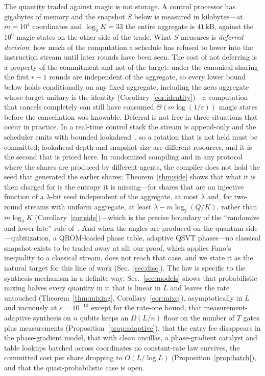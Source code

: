 \documentclass[aps,prx,twocolumn,superscriptaddress,nofootinbib,longbibliography]{revtex4-2}
\theoremstyle{plain}
\theoremstyle{definition}
\theoremstyle{remark}
\begin{document}
The quantity traded against magic is not storage. A control processor has gigabytes of memory and the snapshot $S$ below is measured in kilobytes---at $m=10^4$ coordinates and $\log_2K=33$ the entire aggregate is $41$\,kB, against the $10^6$ magic states on the other side of the trade. What $S$ measures is \emph{deferred decision}: how much of the computation a schedule has refused to lower into the instruction stream until later rounds have been seen. The cost of not deferring is a property of the commitment and not of the target: under the canonical sharing the first $r-1$ rounds are independent of the aggregate, so every lower bound below holds conditionally on any fixed aggregate, including the zero aggregate whose target unitary is the identity (Corollary~\ref{cor:identity})---a computation that cancels completely can still have consumed $\Theta(m\log(1/\varepsilon))$ magic states before the cancellation was knowable. Deferral is not free in three situations that occur in practice. In a real-time control stack the stream is append-only and the scheduler emits with bounded lookahead~\cite{Caune,Fowler}, so a rotation that is not held must be committed; lookahead depth and snapshot size are different resources, and it is the second that is priced here. In randomized compiling and in any protocol where the shares are produced by different agents, the compiler does not hold the seed that generated the earlier shares; Theorem~\ref{thm:side} shows that what it is then charged for is the entropy it is missing---for shares that are an injective function of a $\lambda$-bit seed independent of the aggregate, at most $\lambda$ and, for two-round streams with uniform aggregate, at least $\lambda-m\log_2(Q/K)$, rather than $m\log_2K$ (Corollary~\ref{cor:side})---which is the precise boundary of the ``randomize and lower late'' rule of~\cite{Paper1}. And when the angles are produced on the quantum side---qubitization, a QROM-loaded phase table, adaptive QSVT phases---no classical snapshot exists to be traded away at all; our proof, which applies Fano's inequality to a classical stream, does not reach that case, and we state it as the natural target for this line of work (Sec.~\ref{sec:disc}). The law is specific to the synthesis mechanism in a definite way: Sec.~\ref{sec:models} shows that probabilistic mixing halves every quantity in it that is linear in $L$ and leaves the rate untouched (Theorem~\ref{thm:mixing}, Corollary~\ref{cor:mixq}), asymptotically in $L$ and vacuously at $\varepsilon=10^{-10}$ except for the rate-one bound, that measurement-adaptive synthesis on $n$ qubits keeps an $\Omega(L/n)$ floor on the number of $T$ gates plus measurements (Proposition~\ref{prop:adaptive}), that the entry fee disappears in the phase-gradient model, that with clean ancillas, a phase-gradient catalyst and table lookups batched across coordinates no constant-rate law survives, the committed cost per share dropping to $O(L/\log L)$ (Proposition~\ref{prop:batch}), and that the quasi-probabilistic case is open.
\end{document}
